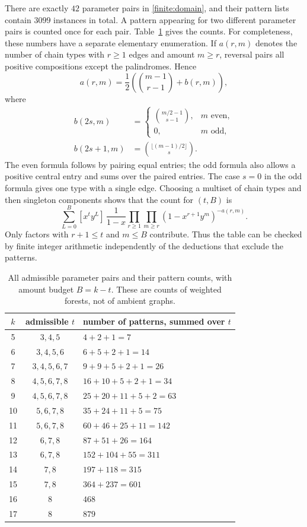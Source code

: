 There are exactly $42$ parameter pairs in \eqref{finite:domain},
and their pattern lists contain $3099$ instances in total.  A pattern
appearing for two different parameter pairs is counted once for each
pair.  Table~\ref{finite:counts} gives the counts.  For completeness,
these numbers have a separate elementary enumeration.  If $a(r,m)$
denotes the number of chain types with $r\ge1$ edges and amount
$m\ge r$, reversal pairs all positive compositions except the
palindromes.  Hence
\begin{equation}\label{finite:chain-count}
 a(r,m)=\frac12\left(\binom{m-1}{r-1}+b(r,m)\right),
\end{equation}
where
\[
 \begin{aligned}
 b(2s,m)&=
 \begin{cases}
  \binom{m/2-1}{s-1},&m\text{ even},\\
  0,&m\text{ odd},
 \end{cases}\\
 b(2s+1,m)&=\binom{\lfloor(m-1)/2\rfloor}{s}.
 \end{aligned}
\]
The even formula follows by pairing equal entries; the odd formula
also allows a positive central entry and sums over the paired entries.
The case $s=0$ in the odd formula gives one type with a single edge.
Choosing a multiset of chain types and then singleton components shows
that the count for $(t,B)$ is
\begin{equation}\label{finite:count-series}
 \sum_{L=0}^{B}[x^t y^L]\,
 \frac{1}{1-x}
 \prod_{r\ge1}\prod_{m\ge r}
       (1-x^{r+1}y^m)^{-a(r,m)}.
\end{equation}
Only factors with $r+1\le t$ and $m\le B$ contribute.  Thus the
table can be checked by finite integer arithmetic independently of
the deductions that exclude the patterns.

\begin{table}[htbp]
\centering
\begin{tabular}{ccl}
$k$ & admissible $t$ & number of patterns, summed over $t$\\
\hline
5 & $3,4,5$ & $4+2+1=7$\\
6 & $3,4,5,6$ & $6+5+2+1=14$\\
7 & $3,4,5,6,7$ & $9+9+5+2+1=26$\\
8 & $4,5,6,7,8$ & $16+10+5+2+1=34$\\
9 & $4,5,6,7,8$ & $25+20+11+5+2=63$\\
10 & $5,6,7,8$ & $35+24+11+5=75$\\
11 & $5,6,7,8$ & $60+46+25+11=142$\\
12 & $6,7,8$ & $87+51+26=164$\\
13 & $6,7,8$ & $152+104+55=311$\\
14 & $7,8$ & $197+118=315$\\
15 & $7,8$ & $364+237=601$\\
16 & $8$ & $468$\\
17 & $8$ & $879$
\end{tabular}
\caption{All admissible parameter pairs and their pattern counts,
with amount budget $B=k-t$.  These are counts of weighted forests,
not of ambient graphs.}
\label{finite:counts}
\end{table}

